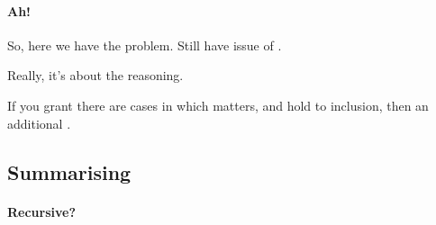 \paragraph{Ah!}

\begin{note}
  So, here we have the problem.
  Still have issue of \requ{}.

  Really, it's about the reasoning.

  If you grant there are cases in which \qzS{} matters, and hold to inclusion, then an additional \requ{}.
\end{note}

\subsection{Summarising}
\label{sec:summarising}

\paragraph{Recursive?}
\nocite{Besson:2018wz} %
\nocite{Wieland:2013vf} %

